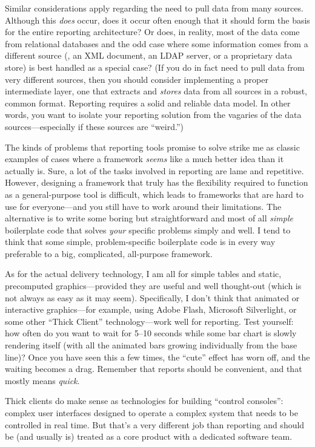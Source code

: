 Similar considerations apply regarding the need to pull data from
many sources. Although this \emph{does} occur, does it occur often
enough that it should form the basis for the entire reporting
architecture? Or does, in reality, most of the data come from
relational databases and the odd case where some information comes
from a different source (\eg, an XML document, an LDAP server, or a
proprietary data store) is best handled as a special case?  (If you do
in fact need to pull data from very different sources, then you should
consider implementing a proper intermediate layer, one that extracts
and \emph{stores} data from all sources in a robust, common format.
Reporting requires a solid and reliable data model.  In other words,
you want to isolate your reporting solution from the vagaries of the
data sources---especially if these sources are ``weird.'')

The kinds of problems that reporting tools promise to solve strike me
as classic examples of cases where a framework \emph{seems} like a
much better idea than it actually is. Sure, a lot of the tasks
involved in reporting are lame and repetitive. However, designing a
framework that truly has the flexibility required to function as a
general-purpose tool is difficult, which leads to frameworks that are
hard to use for everyone---and you still have to work around their
limitations.  The alternative is to write some boring but
straightforward and most of all \emph{simple} boilerplate code that
solves \emph{your} specific problems simply and well. I tend to think
that some simple, problem-specific boilerplate code is in every way
preferable to a big, complicated, all-purpose framework.

As for the actual delivery technology, I am all for simple tables and
static, precomputed graphics---provided they are useful and well
thought-out (which is not always as easy as it may seem).
Specifically, I don't think that animated or interactive
graphics---for example, using Adobe Flash, Microsoft Silverlight, or
some other ``Thick Client'' technology---work well for reporting. Test
yourself: how often do you want to wait for 5--10 seconds while some
bar chart is slowly rendering itself (with all the animated bars
growing individually from the base line)? Once you have seen this a
few times, the ``cute'' effect has worn off, and the waiting becomes a
drag.  Remember that reports should be convenient, and that mostly
means \emph{quick}.

Thick clients do make sense as technologies for building ``control
consoles'': complex user interfaces designed to operate a complex
system that needs to be controlled in real time.  But that's a very
different job than reporting and should be (and usually is) treated
as a core product with a dedicated software team.


